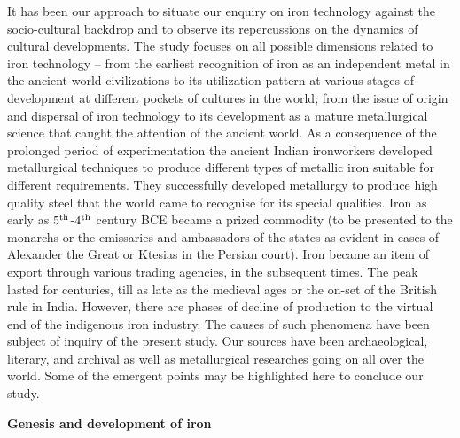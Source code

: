 It has been our approach to situate our enquiry on iron technology against the socio-cultural backdrop and to observe its repercussions on the dynamics of cultural developments. The study focuses on all possible dimensions related to iron technology – from the earliest recognition of iron as an independent metal in the ancient world civilizations to its utilization pattern at various stages of development at different pockets of cultures in the world; from the issue of origin and dispersal of iron technology to its development as a mature metallurgical science that caught the attention of the ancient world. As a consequence of the prolonged period of experimentation the ancient Indian ironworkers developed metallurgical techniques to produce different types of metallic iron suitable for different requirements. They successfully developed metallurgy to produce high quality steel that the world came to recognise for its special qualities. Iron as early as $5^{\rm th}$-$4^{\rm th}$ century BCE became a prized commodity (to be presented to the monarchs or the emissaries and ambassadors of the states as evident in cases of Alexander the Great or Ktesias in the Persian court). Iron became an item of export through various trading agencies, in the subsequent times. The peak lasted for centuries, till as late as the medieval ages or the on-set of the British rule in India. However, there are phases of decline of production to the virtual end of the indigenous iron industry. The causes of such phenomena have been subject of inquiry of the present study. Our sources have been archaeological, literary, and archival as well as metallurgical researches going on all over the world. Some of the emergent points may be highlighted here to conclude our study.

\noindent \textbf{\large Genesis and development of iron}

